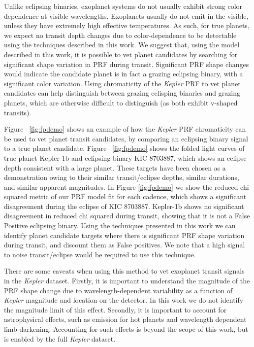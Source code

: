 \documentclass[iop]{emulateapj}
\newcommand{\kepler}{\emph{Kepler}\xspace}
\begin{document}
Unlike eclipsing binaries, exoplanet systems do not usually exhibit strong color dependence at visible wavelengths. Exoplanets usually do not emit in the visible, unless they have extremely high effective temperatures. As such, for true planets, we expect no transit depth changes due to color-dependence to be detectable using the techniques described in this work. We suggest that, using the model described in this work, it is possible to vet planet candidates by searching for significant shape variation in PRF during transit. Significant PRF shape changes would indicate the candidate planet is in fact a grazing eclipsing binary, with a significant color variation. Using chromaticity of the \kepler PRF to vet planet candidates can help distinguish between grazing eclisping binaries and grazing planets, which are otherwise difficult to distinguish (as both exhibit v-shaped transits).

Figure ~\ref{fig:fpdemo} shows an example of how the \kepler PRF chromaticity can be used to vet planet transit candidates, by comparing an eclipsing binary signal to a true planet candidate. Figure ~\ref{fig:fpdemo} shows the folded light curves of true planet Kepler-1b and eclipsing binary KIC 8703887, which shows an eclipse depth consistent with a large planet. These targets have been chosen as a demonstration owing to their similar transit/eclipse depths, similar durations, and similar apparent magnitudes. In Figure \ref{fig:fpdemo} we show the reduced chi squared metric of our PRF model fit for each cadence, which shows a significant disagreement during the eclipse of KIC 8703887. Kepler-1b shows no significant disagreement in reduced chi squared during transit, showing that it is not a False Positive eclipsing binary. Using the techniques presented in this work we can identify planet candidate targets where there is significant PRF shape variation during transit, and discount them as False positives. We note that a high signal to noise transit/eclipse would be required to use this technique.

There are some caveats when using this method to vet exoplanet transit signals in the \kepler dataset. Firstly, it is important to understand the magnitude of the PRF shape change due to wavelength-dependent variability as a function of \kepler magnitude and location on the detector. In this work we do not identify the magnitude limit of this effect. Secondly, it is important to account for astrophysical effects, such as emission for hot planets and wavelength dependent limb darkening. Accounting for such effects is beyond the scope of this work, but is enabled by the full \kepler dataset.
\end{document}
